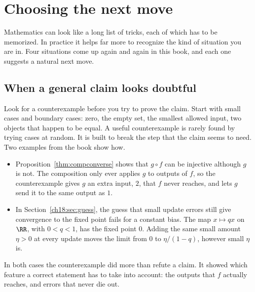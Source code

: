 \section{Choosing the next move}\label{appE:sec:next-move}
Mathematics can look like a long list of tricks, each of which has to be memorized. In practice it helps far more to recognize the kind of situation you are in. Four situations come up again and again in this book, and each one suggests a natural next move.

\subsection*{When a general claim looks doubtful}
Look for a counterexample before you try to prove the claim. Start with small cases and boundary cases: zero, the empty set, the smallest allowed input, two objects that happen to be equal. A useful counterexample is rarely found by trying cases at random. It is built to break the step that the claim seems to need. Two examples from the book show how.
\begin{itemize}
\item Proposition~\ref{thm:compconverse} shows that $g\circ f$ can be injective although $g$ is not. The composition only ever applies $g$ to outputs of $f$, so the counterexample gives $g$ an extra input, $2$, that $f$ never reaches, and lets $g$ send it to the same output as $1$.
\item In Section~\ref{ch18:sec:guess}, the guess that small update errors still give convergence to the fixed point fails for a constant bias. The map $x\mapsto qx$ on $\RR$, with $0<q<1$, has the fixed point $0$. Adding the same small amount $\eta>0$ at every update moves the limit from $0$ to $\eta/(1-q)$, however small $\eta$ is.
\end{itemize}
In both cases the counterexample did more than refute a claim. It showed which feature a correct statement has to take into account: the outputs that $f$ actually reaches, and errors that never die out.

